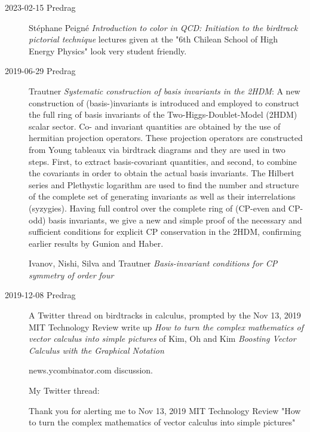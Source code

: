 \begin{description}
   \item[2023-02-15 Predrag]
St{\'e}phane Peign{\'e}
{\em Introduction to color in QCD: Initiation to the birdtrack pictorial technique}
lectures given at the "6th Chilean School of High Energy Physics" look
very student friendly.

\item[2019-06-29 Predrag]
Trautner
{\em Systematic construction of basis invariants in the {2HDM}}:
A new construction of (basis-)invariants is introduced and
employed to construct the full ring of basis invariants of the
Two-Higgs-Doublet-Model (2HDM) scalar sector. Co- and invariant
quantities are obtained by the use of hermitian projection operators.
These projection operators are constructed from Young tableaux via
birdtrack diagrams and they are used in two steps. First, to extract
basis-covariant quantities, and second, to combine the covariants in
order to obtain the actual basis invariants. The Hilbert series and
Plethystic logarithm are used to find the number and structure of the
complete set of generating invariants as well as their interrelations
(syzygies). Having full control over the complete ring of (CP-even and
CP-odd) basis invariants, we give a new and simple proof of the necessary
and sufficient conditions for explicit CP conservation in the 2HDM,
confirming earlier results by Gunion and Haber.

Ivanov, Nishi, Silva and Trautner
{\em Basis-invariant conditions for {CP} symmetry of order four}

\item[2019-12-08 Predrag]
A 
{Twitter thread} on birdtracks in calculus, prompted by
the Nov 13, 2019 MIT Technology Review
{write up}
{\em How to turn the complex mathematics of vector calculus into simple pictures}
of Kim, Oh and Kim
{\em Boosting Vector Calculus with the Graphical Notation} 

{news.ycombinator.com} discussion.

My Twitter thread:

Thank you for alerting me to Nov 13, 2019 MIT Technology Review "How to
turn the complex mathematics of vector calculus into simple pictures"


\end{description}
